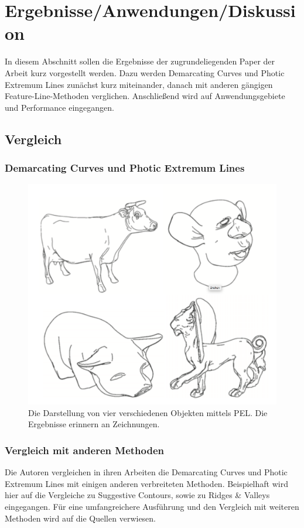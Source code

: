 \documentclass{paperStyle}
\begin{document}
\section{Ergebnisse/Anwendungen/Diskussion}
In diesem Abschnitt sollen die Ergebnisse der zugrundeliegenden Paper der Arbeit kurz vorgestellt werden. Dazu werden Demarcating Curves und Photic Extremum Lines zunächst kurz miteinander, danach mit anderen gängigen Feature-Line-Methoden verglichen. Anschließend wird auf Anwendungsgebiete und Performance eingegangen. 
\subsection{Vergleich}
\subsubsection{Demarcating Curves und Photic Extremum Lines}
\begin{figure}
	\centering
		\includegraphics[width=0.9\linewidth]{resultspel.png}
	\caption{Die Darstellung von vier verschiedenen Objekten mittels PEL. Die Ergebnisse erinnern an Zeichnungen.\cite{Xie2007}}
	\label{anwpel}
\end{figure}
\subsubsection{Vergleich mit anderen Methoden}
Die Autoren vergleichen in ihren Arbeiten die Demarcating Curves \cite{Demarcating} und Photic Extremum Lines \cite{Xie2007} mit einigen anderen verbreiteten Methoden. Beispielhaft wird hier auf die Vergleiche zu Suggestive Contours, sowie zu Ridges \& Valleys eingegangen. Für eine umfangreichere Ausführung und den Vergleich mit weiteren Methoden wird auf die Quellen verwiesen. 
\end{document}
